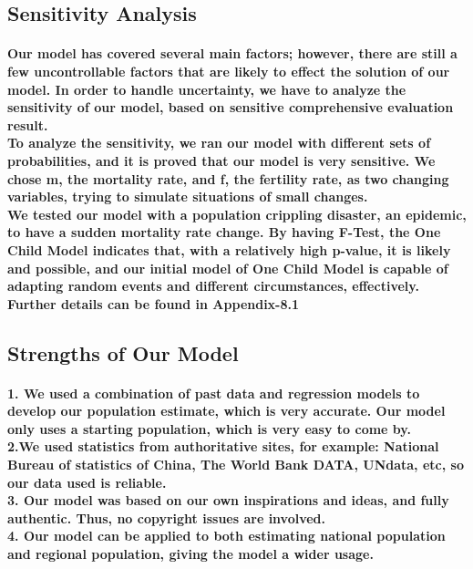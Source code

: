 \documentclass{article}
\begin{document}
\subsection{Sensitivity Analysis}
\paragraph{Our model has covered several main factors; however, there are still a few uncontrollable factors that are likely to effect the solution of our model. In order to handle uncertainty, we have to analyze the sensitivity of our model, based on sensitive comprehensive evaluation result. \\
To analyze the sensitivity, we ran our model with different sets of probabilities, and it is proved that our model is very sensitive. We chose m, the mortality rate, and f, the fertility rate, as two changing variables, trying to simulate situations of small changes. \\
We tested our model with a population crippling disaster, an epidemic, to have a sudden mortality rate change. By having F-Test, the One Child Model indicates that, with a relatively high p-value, it is likely and possible, and our initial model of One Child Model is capable of adapting random events and different circumstances, effectively. \\
Further details can be found in Appendix-8.1}

\subsection{Strengths of Our Model}
\paragraph{1. We used a combination of past data and regression models to develop our population estimate, which is very accurate. Our model only uses a starting population, which is very easy to come by.\\ 
2.We used statistics from authoritative sites, for example: National Bureau of statistics of China, The World Bank DATA, UNdata, etc, so our data used is reliable. \\
3. Our model was based on our own inspirations and ideas, and fully authentic. Thus, no copyright issues are involved. \\
4. Our model can be applied to both estimating national population and regional population, giving the model a wider usage. \\ }
\end{document}
